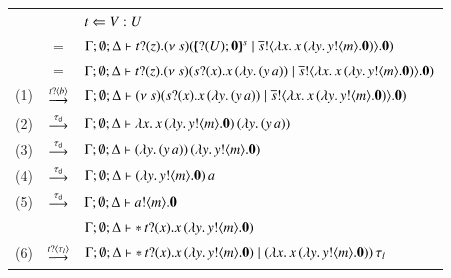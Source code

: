 \begin{figure}[!t]
	\begin{tabular}{rcl}
         &    &   $t \Leftarrow V:U$  \\
		   &  $=$ & $\Gamma; \emptyset; \Delta \vdash t ? (z) . (\nu\ s)([\!\!(? (U) ; \mathbf{0})\!\!]^{s} \;|\; \overline{s} ! \langle \lambda x.\,x\,(\lambda y.\,y ! \langle m \rangle . \mathbf{0}) \rangle . \mathbf{0})$\\
		&  $=$& $\Gamma; \emptyset; \Delta \vdash t ? (z) . (\nu\ s)(s ? (x) . x\,(\lambda y.\,(y\,a)) \;|\; \overline{s} ! \langle \lambda x.\,x\,(\lambda y.\,y ! \langle m \rangle . \mathbf{0}) \rangle . \mathbf{0})$\\
		(1)   &$\stackrel{t ? \langle b \rangle}{\longrightarrow}$& $\Gamma; \emptyset; \Delta \vdash (\nu\ s)(s ? (x) . x\,(\lambda y.\,(y\,a)) \;|\; \overline{s} ! \langle \lambda x.\,x\,(\lambda y.\,y ! \langle m \rangle . \mathbf{0}) \rangle . \mathbf{0})$\\
		(2)  &$\stackrel{\tau_{\mathsf{d}}}{\longrightarrow}$& $\Gamma; \emptyset; \Delta \vdash \lambda x.\,x\,(\lambda y.\,y ! \langle m \rangle . \mathbf{0})\,(\lambda y.\,(y\,a))$\\
		(3)  &$\stackrel{\tau_{\mathsf{d}}}{\longrightarrow}$& $\Gamma; \emptyset; \Delta \vdash (\lambda y.\,(y\,a))\,(\lambda y.\,y ! \langle m \rangle . \mathbf{0}) $\\
		(4)   &$\stackrel{\tau_{\mathsf{d}}}{\longrightarrow}$& $\Gamma; \emptyset; \Delta \vdash (\lambda y.\,y ! \langle m \rangle . \mathbf{0})\,a$\\
		(5)   &$\stackrel{\tau_{\mathsf{d}}}{\longrightarrow}$& $\Gamma; \emptyset; \Delta \vdash a ! \langle m \rangle . \mathbf{0}$ \vspace{1mm} 
	\\ \hline
		 & & $\Gamma; \emptyset; \Delta \vdash \ast\,{} t ? (x) . x\,(\lambda y.\,y ! \langle m \rangle . \mathbf{0}) $\\
		(6) &$\stackrel{t ? \langle \tau_l \rangle}{\longrightarrow}$& $\Gamma; \emptyset; \Delta \vdash \ast\,{} t ? (x) . x\,(\lambda y.\,y ! \langle m \rangle . \mathbf{0}) \;|\; (\lambda x.\,x\,(\lambda y.\,y ! \langle m \rangle . \mathbf{0}))\,\tau_l$\\

\end{tabular}
\end{figure}
